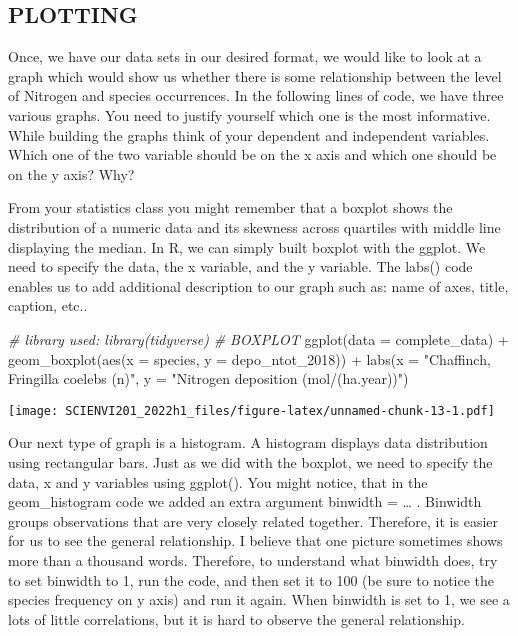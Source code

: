 \documentclass[
]{article}
\newenvironment{Shaded}{\begin{snugshade}}{\end{snugshade}}
\newcommand{\AttributeTok}[1]{\textcolor[rgb]{0.77,0.63,0.00}{#1}}
\newcommand{\CommentTok}[1]{\textcolor[rgb]{0.56,0.35,0.01}{\textit{#1}}}
\newcommand{\FunctionTok}[1]{\textcolor[rgb]{0.00,0.00,0.00}{#1}}
\newcommand{\NormalTok}[1]{#1}
\newcommand{\SpecialCharTok}[1]{\textcolor[rgb]{0.00,0.00,0.00}{#1}}
\newcommand{\StringTok}[1]{\textcolor[rgb]{0.31,0.60,0.02}{#1}}
\begin{document}
\hypertarget{plotting}{%
\subsection{PLOTTING}\label{plotting}}

Once, we have our data sets in our desired format, we would like to look
at a graph which would show us whether there is some relationship
between the level of Nitrogen and species occurrences. In the following
lines of code, we have three various graphs. You need to justify
yourself which one is the most informative. While building the graphs
think of your dependent and independent variables. Which one of the two
variable should be on the x axis and which one should be on the y axis?
Why?

From your statistics class you might remember that a boxplot shows the
distribution of a numeric data and its skewness across quartiles with
middle line displaying the median. In R, we can simply built boxplot
with the ggplot. We need to specify the data, the x variable, and the y
variable. The labs() code enables us to add additional description to
our graph such as: name of axes, title, caption, etc..

\begin{Shaded}
\begin{Highlighting}[]
\CommentTok{\# library used: library(tidyverse)}
\CommentTok{\# BOXPLOT}
\FunctionTok{ggplot}\NormalTok{(}\AttributeTok{data =}\NormalTok{ complete\_data) }\SpecialCharTok{+} 
  \FunctionTok{geom\_boxplot}\NormalTok{(}\FunctionTok{aes}\NormalTok{(}\AttributeTok{x =}\NormalTok{ species, }\AttributeTok{y =}\NormalTok{ depo\_ntot\_2018)) }\SpecialCharTok{+}
  \FunctionTok{labs}\NormalTok{(}\AttributeTok{x =} \StringTok{"Chaffinch, Fringilla coelebs (n)"}\NormalTok{,}
      \AttributeTok{y =} \StringTok{"Nitrogen deposition (mol/(ha.year))"}\NormalTok{)}
\end{Highlighting}
\end{Shaded}

\texttt{[image: SCIENVI201\_2022h1\_files/figure-latex/unnamed-chunk-13-1.pdf]}

Our next type of graph is a histogram. A histogram displays data
distribution using rectangular bars. Just as we did with the boxplot, we
need to specify the data, x and y variables using ggplot(). You might
notice, that in the geom\_histogram code we added an extra argument
binwidth = \ldots{} . Binwidth groups observations that are very closely
related together. Therefore, it is easier for us to see the general
relationship. I believe that one picture sometimes shows more than a
thousand words. Therefore, to understand what binwidth does, try to set
binwidth to 1, run the code, and then set it to 100 (be sure to notice
the species frequency on y axis) and run it again. When binwidth is set
to 1, we see a lots of little correlations, but it is hard to observe
the general relationship.
\end{document}
